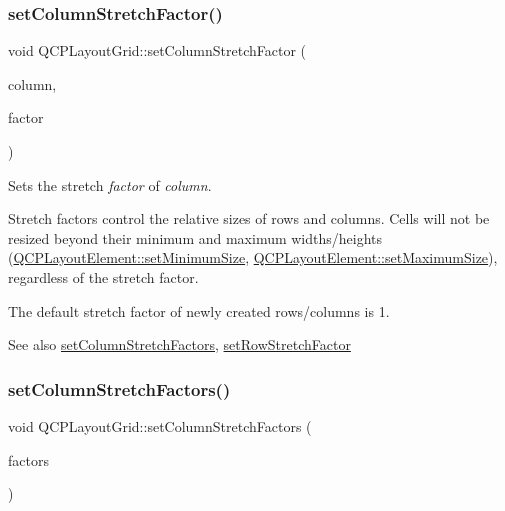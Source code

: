 \subsubsection{\texorpdfstring{set\+Column\+Stretch\+Factor()}{setColumnStretchFactor()}}
{\footnotesize\ttfamily void Q\+C\+P\+Layout\+Grid\+::set\+Column\+Stretch\+Factor (\begin{DoxyParamCaption}\item[{int}]{column,  }\item[{double}]{factor }\end{DoxyParamCaption})}

Sets the stretch {\itshape factor} of {\itshape column}.

Stretch factors control the relative sizes of rows and columns. Cells will not be resized beyond their minimum and maximum widths/heights (\mbox{\hyperlink{class_q_c_p_layout_element_a5dd29a3c8bc88440c97c06b67be7886b}{Q\+C\+P\+Layout\+Element\+::set\+Minimum\+Size}}, \mbox{\hyperlink{class_q_c_p_layout_element_a74eb5280a737ab44833d506db65efd95}{Q\+C\+P\+Layout\+Element\+::set\+Maximum\+Size}}), regardless of the stretch factor.

The default stretch factor of newly created rows/columns is 1.

\begin{DoxySeeAlso}{See also}
\mbox{\hyperlink{class_q_c_p_layout_grid_a6c2591d1a7e2534ce036989543b49e57}{set\+Column\+Stretch\+Factors}}, \mbox{\hyperlink{class_q_c_p_layout_grid_a7b0273de5369bd93d942edbaf5b166ec}{set\+Row\+Stretch\+Factor}} 
\end{DoxySeeAlso}
\mbox{\label{class_q_c_p_layout_grid_a6c2591d1a7e2534ce036989543b49e57}} 
\subsubsection{\texorpdfstring{set\+Column\+Stretch\+Factors()}{setColumnStretchFactors()}}
{\footnotesize\ttfamily void Q\+C\+P\+Layout\+Grid\+::set\+Column\+Stretch\+Factors (\begin{DoxyParamCaption}\item[{const Q\+List$<$ double $>$ \&}]{factors }\end{DoxyParamCaption})}

